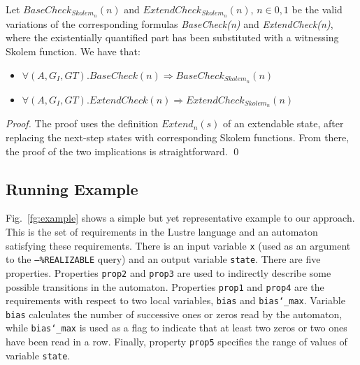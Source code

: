 \begin{theorem} Let $BaseCheck_{Skolem_n}(n)$ and
$ExtendCheck_{Skolem_n}(n)$, $n \in {0,1}$ be the valid
variations of the corresponding formulas \textit{BaseCheck(n)} and
\textit{ExtendCheck(n)}, where the existentially quantified part has been substituted
with a witnessing Skolem function. We have that:
\begin{itemize}
\item $\forall (A,G_{I},G{T}). BaseCheck(n) \Rightarrow BaseCheck_{Skolem_n}(n)$
\item $\forall (A,G_{I},G{T}). ExtendCheck(n) \Rightarrow
ExtendCheck_{Skolem_n}(n)$
\end{itemize}
\end{theorem}
\begin{proof}
The proof uses the definition \textit{$Extend_n(s)$} of an extendable state,
after replacing the next-step states with corresponding Skolem functions. From there,
the proof of the two implications is straightforward.
\qed
\end{proof}

 \subsection{Running Example} 
 
 Fig.~\ref{fg:example} shows a
 simple but yet representative example to our approach.
 This is the set of requirements  in the Lustre language and an automaton satisfying these requirements.
 There is an input variable \texttt{x} (used as an argument to the \texttt{--\%REALIZABLE} query) and an output variable \texttt{state}.
 There are five properties.
 Properties \texttt{prop2} and \texttt{prop3} are used to indirectly describe some
 possible transitions in the automaton. Properties \texttt{prop1} and
 \texttt{prop4} are the requirements with respect to two local variables, \texttt{bias}
 and \texttt{bias\char`_max}. Variable \texttt{bias} calculates the number of successive
 ones or zeros read by the automaton, while \texttt{bias\char`_max} is used as a flag
 to indicate that at least two zeros or two ones have been read in a row.
 Finally, property \texttt{prop5} specifies the range of values of variable \texttt{state}.
 
